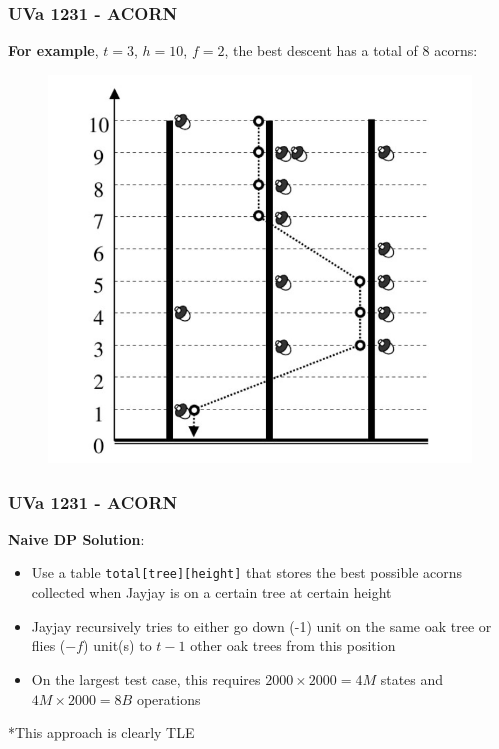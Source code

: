 \documentclass{beamer}
\begin{document}
\begin{frame}[fragile]
\frametitle{UVa 1231 - ACORN}

\textbf{For example}, $t=3$, $h=10$, $f=2$, the best descent has a total of $8$ acorns:

\begin{figure}
    \centering
    \includegraphics[scale=0.4]{imgs/uva_1231.png}
\end{figure}

\end{frame}

\begin{frame}[fragile]
\frametitle{UVa 1231 - ACORN}

\textbf{Naive DP Solution}:

\vspace{0.3cm}

\begin{itemize}
    \item Use a table \verb|total[tree][height]| that stores the best possible acorns collected when Jayjay is on a certain tree at certain height
    \item Jayjay recursively tries to either go down (-1) unit on the same oak tree or flies ($-f$) unit(s) to $t-1$ other oak trees from this position
    \item On the largest test case, this requires $2000 \times 2000 = 4M$ states and $4M \times 2000 = 8B$ operations
\end{itemize}

\vspace{0.3cm}

\color{blue}*This approach is clearly TLE\color{black}

\end{frame}
\end{document}
